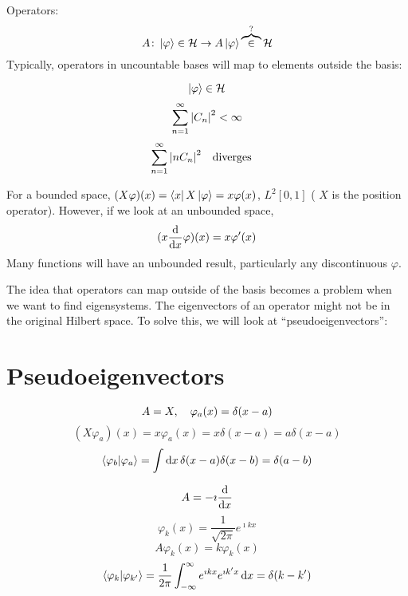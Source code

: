 \documentclass[a4paper,twoside,master.tex]{subfiles}
\begin{document}
Operators:
\begin{equation}
    A\colon \ket{\varphi} \in \mathcal{H} \to A \ket{\varphi} \overbrace{\in}^{?}\mathcal{H}
\end{equation}
Typically, operators in uncountable bases will map to elements outside the basis:
\begin{ex}
    \begin{equation}
        \ket{\varphi} \in \mathcal{H}
    \end{equation}
    \begin{equation}
        \sum_{n=1}^{\infty} \abs{C_n}^2 < \infty
    \end{equation}
    \begin{equation}
        \sum_{n=1}^{\infty} \abs{n C_n}^2 \qq{diverges}
    \end{equation}
\end{ex}
For a bounded space, $ (X \varphi)(x) = \bra{x} X \ket{\varphi} = x \varphi (x) $, $ L^2 [0,1] $ ( $ X $ is the position operator). However, if we look at an unbounded space,
\begin{equation}
    (x \dv{x} \varphi )(x) = x \varphi'(x)
\end{equation}
Many functions will have an unbounded result, particularly any discontinuous $ \varphi $.

The idea that operators can map outside of the basis becomes a problem when we want to find eigensystems. The eigenvectors of an operator might not be in the original Hilbert space. To solve this, we will look at ``pseudoeigenvectors'':

\section{Pseudoeigenvectors}
\label{sec:pseudoeigenvectors}

\begin{equation}
    A = X \qc \varphi_a(x) = \delta(x-a)
\end{equation}
\begin{equation}
    (X \varphi_a)(x) = x \varphi_a(x) = x \delta(x-a) = a \delta(x-a)
\end{equation}
\begin{equation}
    \bra{\varphi_b} \ket{\varphi_a} = \int \dd{x} \delta(x-a) \delta(x-b) = \delta(a-b)
\end{equation}

\begin{equation}
    A = -\imath \dv{x}
\end{equation}
\begin{equation}
    \varphi_k(x) = \frac{1}{\sqrt{2 \pi}} e^{\imath kx}
\end{equation}
\begin{equation}
    A \varphi_k(x) = k \varphi_k(x)
\end{equation}
\begin{equation}
    \bra{\varphi_k} \ket{\varphi_{k'}} = \frac{1}{2 \pi} \int_{- \infty}^{\infty} e^{\imath k x} e^{\imath k' x} \dd{x} = \delta(k - k')
\end{equation}
\end{document}
